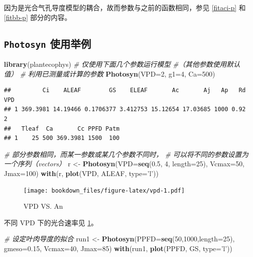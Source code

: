 \documentclass[]{krantz}
\makeatletter
\newenvironment{Shaded}{\begin{snugshade}}{\end{snugshade}}
\newcommand{\KeywordTok}[1]{\textcolor[rgb]{0.13,0.29,0.53}{\textbf{#1}}}
\newcommand{\DataTypeTok}[1]{\textcolor[rgb]{0.13,0.29,0.53}{#1}}
\newcommand{\DecValTok}[1]{\textcolor[rgb]{0.00,0.00,0.81}{#1}}
\newcommand{\FloatTok}[1]{\textcolor[rgb]{0.00,0.00,0.81}{#1}}
\newcommand{\StringTok}[1]{\textcolor[rgb]{0.31,0.60,0.02}{#1}}
\newcommand{\CommentTok}[1]{\textcolor[rgb]{0.56,0.35,0.01}{\textit{#1}}}
\newcommand{\NormalTok}[1]{#1}
\newenvironment{kframe}{%
\medskip{}
\setlength{\fboxsep}{.8em}
 \def\at@end@of@kframe{}%
 \ifinner\ifhmode%
  \def\at@end@of@kframe{\end{minipage}}%
  \begin{minipage}{\columnwidth}%
 \fi\fi%
 \def\FrameCommand##1{\hskip\@totalleftmargin \hskip-\fboxsep
 \colorbox{shadecolor}{##1}\hskip-\fboxsep
     \hskip-\linewidth \hskip-\@totalleftmargin \hskip\columnwidth}%
 \MakeFramed {\advance\hsize-\width
   \@totalleftmargin\z@ \linewidth\hsize
   \@setminipage}}%
 {\par\unskip\endMakeFramed%
 \at@end@of@kframe}
\renewenvironment{Shaded}{\begin{kframe}}{\end{kframe}}
\theoremstyle{definition}
\theoremstyle{definition}
\theoremstyle{definition}
\theoremstyle{remark}
\makeatother
\begin{document}
因为是光合气孔导度模型的耦合，故而参数与之前的函数相同，参见
\ref{fitaci-p} 和 \ref{fitbb-p} 部分的内容。

\subsection{\texorpdfstring{\texttt{Photosyn}
使用举例}{Photosyn 使用举例}}\label{photo_exam}

\begin{Shaded}
\begin{Highlighting}[]
\KeywordTok{library}\NormalTok{(plantecophys)}
\CommentTok{# 仅使用下面几个参数运行模型}
\CommentTok{#（其他参数使用默认值）}
\CommentTok{# 利用已测量或计算的参数}
\KeywordTok{Photosyn}\NormalTok{(}\DataTypeTok{VPD=}\DecValTok{2}\NormalTok{, }\DataTypeTok{g1=}\DecValTok{4}\NormalTok{, }\DataTypeTok{Ca=}\DecValTok{500}\NormalTok{)}
\end{Highlighting}
\end{Shaded}

\begin{verbatim}
##         Ci    ALEAF        GS    ELEAF       Ac       Aj   Ap   Rd VPD
## 1 369.3981 14.19466 0.1706377 3.412753 15.12654 17.03685 1000 0.92   2
##   Tleaf  Ca       Cc PPFD Patm
## 1    25 500 369.3981 1500  100
\end{verbatim}

\begin{Shaded}
\begin{Highlighting}[]
\CommentTok{# 部分参数相同，而某一参数或某几个参数不同时，}
\CommentTok{# 可以将不同的参数设置为一个序列（vectors）}
\NormalTok{r <-}\StringTok{ }\KeywordTok{Photosyn}\NormalTok{(}\DataTypeTok{VPD=}\KeywordTok{seq}\NormalTok{(}\FloatTok{0.5}\NormalTok{, }\DecValTok{4}\NormalTok{, }\DataTypeTok{length=}\DecValTok{25}\NormalTok{), }
              \DataTypeTok{Vcmax=}\DecValTok{50}\NormalTok{, }\DataTypeTok{Jmax=}\DecValTok{100}\NormalTok{)}
\KeywordTok{with}\NormalTok{(r, }\KeywordTok{plot}\NormalTok{(VPD, ALEAF, }\DataTypeTok{type=}\StringTok{'l'}\NormalTok{))}
\end{Highlighting}
\end{Shaded}

\begin{figure}
\centering
\texttt{[image: bookdown\_files/figure-latex/vpd-1.pdf]}
\caption{\label{fig:vpd}VPD VS. An}
\end{figure}

不同 VPD 下的光合速率见 \ref{fig:vpd}。

\begin{Shaded}
\begin{Highlighting}[]
\CommentTok{# 设定叶肉导度的拟合}
\NormalTok{run1 <-}\StringTok{ }\KeywordTok{Photosyn}\NormalTok{(}\DataTypeTok{PPFD=}\KeywordTok{seq}\NormalTok{(}\DecValTok{50}\NormalTok{,}\DecValTok{1000}\NormalTok{,}\DataTypeTok{length=}\DecValTok{25}\NormalTok{), }
                 \DataTypeTok{gmeso=}\FloatTok{0.15}\NormalTok{, }\DataTypeTok{Vcmax=}\DecValTok{40}\NormalTok{, }\DataTypeTok{Jmax=}\DecValTok{85}\NormalTok{)}
\KeywordTok{with}\NormalTok{(run1, }\KeywordTok{plot}\NormalTok{(PPFD, GS, }\DataTypeTok{type=}\StringTok{'l'}\NormalTok{))}
\end{Highlighting}
\end{Shaded}
\end{document}
